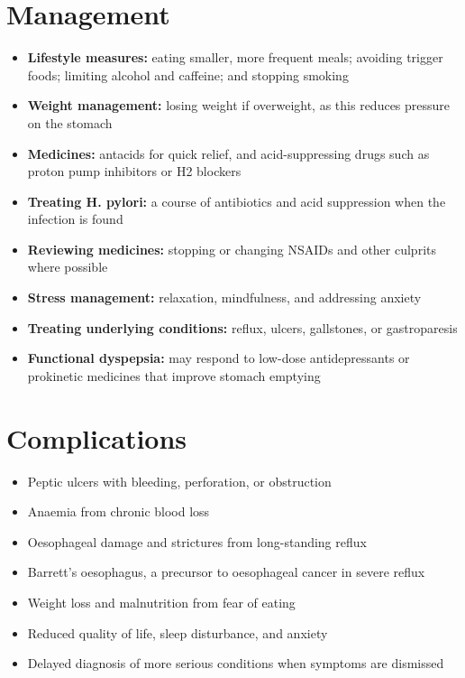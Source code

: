 \section*{Management}
\begin{itemize}
    \item \textbf{Lifestyle measures:} eating smaller, more frequent meals; avoiding trigger foods; limiting alcohol and caffeine; and stopping smoking
    \item \textbf{Weight management:} losing weight if overweight, as this reduces pressure on the stomach
    \item \textbf{Medicines:} antacids for quick relief, and acid-suppressing drugs such as proton pump inhibitors or H2 blockers
    \item \textbf{Treating H. pylori:} a course of antibiotics and acid suppression when the infection is found
    \item \textbf{Reviewing medicines:} stopping or changing NSAIDs and other culprits where possible
    \item \textbf{Stress management:} relaxation, mindfulness, and addressing anxiety
    \item \textbf{Treating underlying conditions:} reflux, ulcers, gallstones, or gastroparesis
    \item \textbf{Functional dyspepsia:} may respond to low-dose antidepressants or prokinetic medicines that improve stomach emptying
\end{itemize}

\section*{Complications}
\begin{itemize}
    \item Peptic ulcers with bleeding, perforation, or obstruction
    \item Anaemia from chronic blood loss
    \item Oesophageal damage and strictures from long-standing reflux
    \item Barrett's oesophagus, a precursor to oesophageal cancer in severe reflux
    \item Weight loss and malnutrition from fear of eating
    \item Reduced quality of life, sleep disturbance, and anxiety
    \item Delayed diagnosis of more serious conditions when symptoms are dismissed
\end{itemize}

